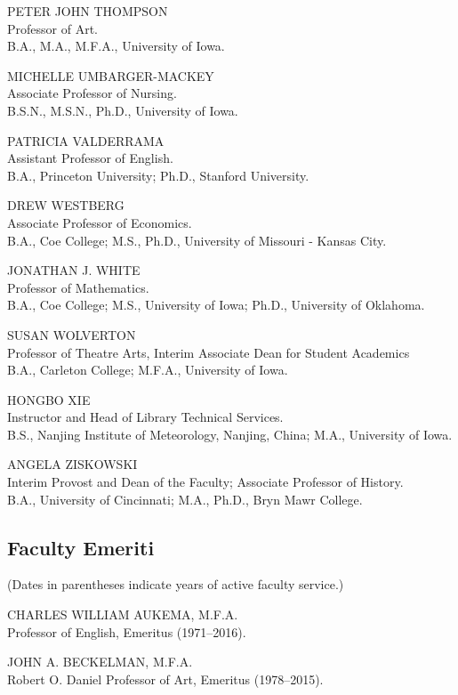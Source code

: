 \documentclass[
  letterpaper,
]{scrbook}
\begin{document}
PETER JOHN THOMPSON\\
Professor of Art.\\
B.A., M.A., M.F.A., University of Iowa.

MICHELLE UMBARGER-MACKEY\\
Associate Professor of Nursing.\\
B.S.N., M.S.N., Ph.D., University of Iowa.

PATRICIA VALDERRAMA\\
Assistant Professor of English.\\
B.A., Princeton University; Ph.D., Stanford University.

DREW WESTBERG\\
Associate Professor of Economics.\\
B.A., Coe College; M.S., Ph.D., University of Missouri - Kansas City.

JONATHAN J. WHITE\\
Professor of Mathematics.\\
B.A., Coe College; M.S., University of Iowa; Ph.D., University of
Oklahoma.

SUSAN WOLVERTON\\
Professor of Theatre Arts, Interim Associate Dean for Student
Academics\\
B.A., Carleton College; M.F.A., University of Iowa.

HONGBO XIE\\
Instructor and Head of Library Technical Services.\\
B.S., Nanjing Institute of Meteorology, Nanjing, China; M.A., University
of Iowa.

ANGELA ZISKOWSKI\\
Interim Provost and Dean of the Faculty; Associate Professor of
History.\\
B.A., University of Cincinnati; M.A., Ph.D., Bryn Mawr College.

\subsection{Faculty Emeriti}\label{faculty-emeriti}

(Dates in parentheses indicate years of active faculty service.)

CHARLES WILLIAM AUKEMA, M.F.A.\\
Professor of English, Emeritus (1971--2016).

JOHN A. BECKELMAN, M.F.A.\\
Robert O. Daniel Professor of Art, Emeritus (1978--2015).
\end{document}
